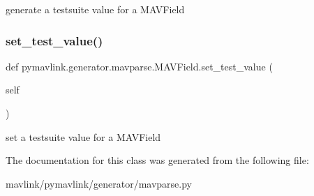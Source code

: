 \begin{DoxyVerb}generate a testsuite value for a MAVField\end{DoxyVerb}
 \mbox{\label{classpymavlink_1_1generator_1_1mavparse_1_1MAVField_a8f6649ad27b22034662c7eea24aba304}} 
\subsubsection{\texorpdfstring{set\+\_\+test\+\_\+value()}{set\_test\_value()}}
{\footnotesize\ttfamily def pymavlink.\+generator.\+mavparse.\+M\+A\+V\+Field.\+set\+\_\+test\+\_\+value (\begin{DoxyParamCaption}\item[{}]{self }\end{DoxyParamCaption})}

\begin{DoxyVerb}set a testsuite value for a MAVField\end{DoxyVerb}
 

The documentation for this class was generated from the following file\+:\begin{DoxyCompactItemize}
\item 
mavlink/pymavlink/generator/mavparse.\+py\end{DoxyCompactItemize}
